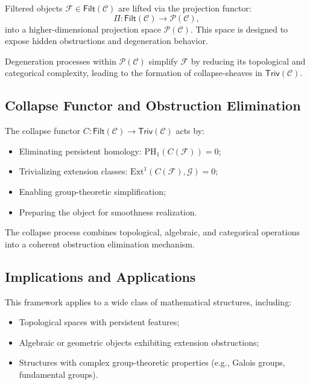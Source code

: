 \documentclass[11pt]{article}
\begin{document}
Filtered objects $\mathcal{F} \in \mathsf{Filt}(\mathcal{C})$ are lifted via the projection functor:
\[
\Pi : \mathsf{Filt}(\mathcal{C}) \longrightarrow \mathcal{P}(\mathcal{C}),
\]
into a higher-dimensional projection space $\mathcal{P}(\mathcal{C})$. This space is designed to expose hidden obstructions and degeneration behavior.

Degeneration processes within $\mathcal{P}(\mathcal{C})$ simplify $\mathcal{F}$ by reducing its topological and categorical complexity, leading to the formation of collapse-sheaves in $\mathsf{Triv}(\mathcal{C})$.

\subsection{Collapse Functor and Obstruction Elimination}

The collapse functor $C : \mathsf{Filt}(\mathcal{C}) \to \mathsf{Triv}(\mathcal{C})$ acts by:

\begin{itemize}
    \item Eliminating persistent homology: $\mathrm{PH}_1(C(\mathcal{F})) = 0$;
    \item Trivializing extension classes: $\mathrm{Ext}^1(C(\mathcal{F}), \mathcal{G}) = 0$;
    \item Enabling group-theoretic simplification;
    \item Preparing the object for smoothness realization.
\end{itemize}

The collapse process combines topological, algebraic, and categorical operations into a coherent obstruction elimination mechanism.

\subsection{Implications and Applications}

This framework applies to a wide class of mathematical structures, including:

\begin{itemize}
    \item Topological spaces with persistent features;
    \item Algebraic or geometric objects exhibiting extension obstructions;
    \item Structures with complex group-theoretic properties (e.g., Galois groups, fundamental groups).
\end{itemize}
\end{document}
